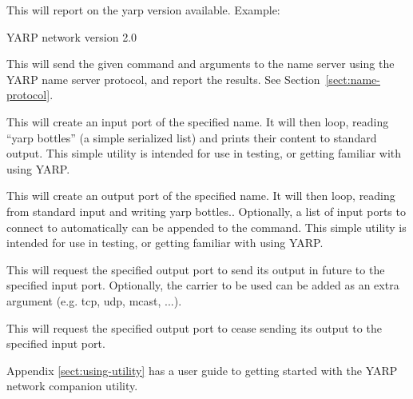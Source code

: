 \newusage{}
%
This will report on the yarp version available.  Example:

\begin{code}
YARP network version 2.0
\end{code}

\newusage{}
%
This will send the given command and arguments to the name server
using the YARP name server protocol, and report the results.
See Section~\ref{sect:name-protocol}.
%

\newusage{}
%
This will create an input port of the specified name.  It will
then loop, 
reading ``yarp bottles'' (a simple serialized list) and prints their content
to standard output.  This simple utility is intended for use in testing, or
getting familiar with using YARP.

\newusage{}
%
This will create an output port of the specified name.  It will then
loop, reading from standard input and writing yarp bottles..
Optionally, a list of input ports to connect to automatically can be
appended to the command.  This simple utility is intended for use in
testing, or getting familiar with using YARP.

\newusage{}
%
This will request the specified output port to send its output in 
future to the specified input port.
Optionally, the carrier to be used can be added as an extra argument
(e.g. tcp, udp, mcast, ...).

\newusage{}
%
This will request the specified output port to cease sending its output to
the specified input port.

Appendix \ref{sect:using-utility} has a user guide to getting started
with the YARP network companion utility.

